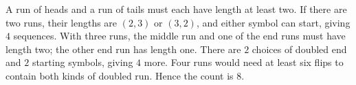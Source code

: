 A run of heads and a run of tails must each have length at least two. If there are two runs, their lengths are $(2,3)$ or $(3,2)$, and either symbol can start, giving $4$ sequences. With three runs, the middle run and one of the end runs must have length two; the other end run has length one. There are $2$ choices of doubled end and $2$ starting symbols, giving $4$ more. Four runs would need at least six flips to contain both kinds of doubled run. Hence the count is $\boxed8$.
